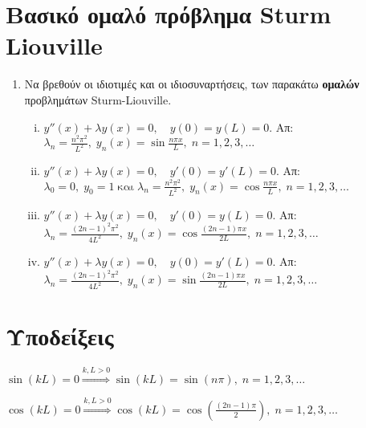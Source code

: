 



\geometry{left=1.5cm, right=1.5cm}

\everymath{\displaystyle}
\thispagestyle{askhseis}



\begin{center}
  \minibox{\large \bfseries \textcolor{Col1}{Προβλήματα Sturm Liouville}}
\end{center}

\vspace{2\baselineskip}


\section*{Βασικό ομαλό πρόβλημα Sturm Liouville}


\begin{enumerate}
  \item Να βρεθούν οι ιδιοτιμές και οι ιδιοσυναρτήσεις, των παρακάτω 
    \textbf{ομαλών} προβλημάτων Sturm-Liouville.
    \begin{enumerate}[i)]
      \item $ y''(x)+ \lambda y(x) = 0, \quad y(0)=y(L)=0 $.  \hfill Απ: $ \lambda 
        _{n} = \frac{n^{2} \pi ^{2}}{L^{2}}, \; y_{n}(x) = \sin{\frac{n \pi x}{L}}, \; 
        n=1,2,3,\ldots $
      \item $ y''(x)+ \lambda y(x) = 0, \quad y'(0)=y'(L)=0 $.  \hfill Απ: $ \lambda 
        _{0} = 0, \; y_{0}= 1 \; \text{και} \; \lambda _{n}= \frac{n^{2} 
        \pi ^{2}}{L^{2}}, \; y_{n}(x) = \cos{\frac{n \pi x}{L}}, \; n=1,2,3,\ldots $
      \item $ y''(x)+ \lambda y(x) = 0, \quad y'(0)=y(L)=0 $.  \hfill Απ: $ \lambda 
        _{n} = \frac{(2n-1)^{2} \pi ^{2}}{4L^{2}}, \; y_{n}(x) = \cos{\frac{(2n-1) \pi
        x}{2L}}, \; n=1,2,3,\ldots $
      \item $ y''(x)+ \lambda y(x) = 0, \quad y(0)=y'(L)=0 $.  \hfill Απ: $ \lambda 
        _{n} = \frac{(2n-1)^{2} \pi ^{2}}{4L^{2}}, \; y_{n}(x) = \sin{\frac{(2n-1) \pi
        x}{2L}}, \; n=1,2,3,\ldots $
    \end{enumerate}
\end{enumerate}

\vspace{2\baselineskip}

\section*{Υποδείξεις}

\begin{myitemize}
  \item $ \sin{(kL)} = 0 \overset{k,L>0}{\Rightarrow} \sin{(kL)} = \sin{(n \pi)}, \;
    n=1,2,3,\ldots $
  \item $ \cos{(kL)} = 0 \overset{k,L>0}{\Rightarrow} \cos{(kL)} =
    \cos{\left(\frac{(2n-1) \pi}{2}\right)}, \;
    n=1,2,3,\ldots $
\end{myitemize}


